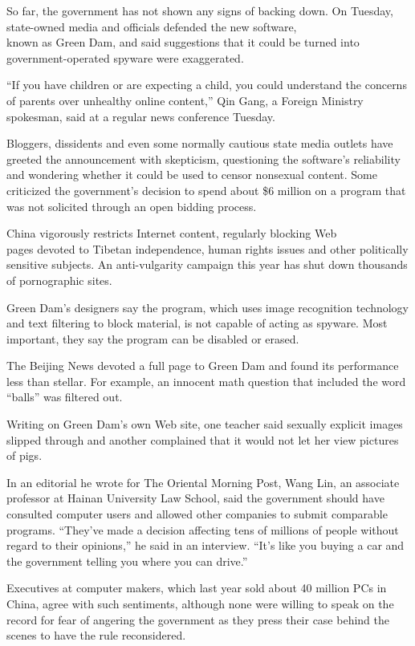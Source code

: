 ﻿\documentclass[12pt,a4paper,onecolumn]{article}
\begin{document}
So far, the government has not shown any signs of backing down. On Tuesday, state-owned media and
officials defended the new software, \\known as Green Dam, and said suggestions that it could be
turned into government-operated spyware were exaggerated.

``If you have children or are expecting a child, you could understand the concerns of parents over
unhealthy online content,'' Qin Gang, a Foreign Ministry spokesman, said at a regular news
conference Tuesday.

Bloggers, dissidents and even some normally cautious state media outlets have greeted the
announcement with skepticism, questioning the software's reliability and wondering whether it could
be used to censor nonsexual content. Some criticized the government's decision to spend about \$6
million on a program that was not solicited through an open bidding process.

China vigorously restricts Internet content, regularly blocking Web \\pages devoted to Tibetan
independence, human rights issues and other politically sensitive subjects. An anti-vulgarity
campaign this year has shut down thousands of pornographic sites.

Green Dam's designers say the program, which uses image recognition technology and text filtering to
block material, is not capable of acting as spyware. Most important, they say the program can be
disabled or erased.

The Beijing News devoted a full page to Green Dam and found its performance less than stellar. For
example, an innocent math question that included the word ``balls'' was filtered out.

Writing on Green Dam's own Web site, one teacher said sexually explicit images slipped through and
another complained that it would not let her view pictures of pigs.

In an editorial he wrote for The Oriental Morning Post, Wang Lin, an associate professor at Hainan
University Law School, said the government should have consulted computer users and allowed other
companies to submit comparable programs. ``They've made a decision affecting tens of millions of
people without regard to their opinions,'' he said in an interview. ``It's like you buying a car and
the government telling you where you can drive.''

Executives at computer makers, which last year sold about 40 million PCs in China, agree with such
sentiments, although none were willing to speak on the record for fear of angering the government as
they press their case behind the scenes to have the rule reconsidered.
\end{document}
